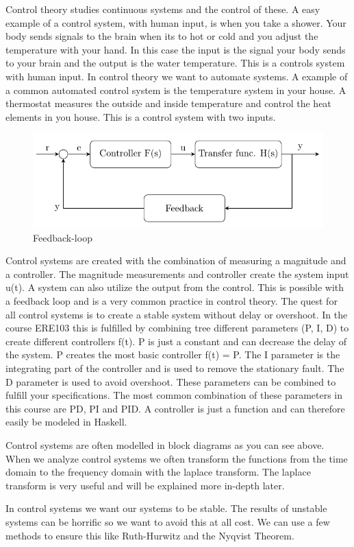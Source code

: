 Control theory studies continuous systems and the control of these. A easy example of a control system, with human input, is when you take a shower. Your body sends signals to the brain when its to hot or cold and you adjust the temperature with your hand. In this case the input is the signal your body sends to your brain and the output is the water temperature. This is a controls system with human input. In control theory we want to automate systems. A example of a common automated control system is the temperature system in your house. A thermostat measures the outside and inside temperature and control the heat elements in you house. This is a control system with two inputs.

\begin{figure}[H]
    \centering
    \includegraphics[]{Images/feedback1.PNG}
    \caption{Feedback-loop}
    \label{fig:feed}
\end{figure}


Control systems are created with the combination of measuring a magnitude and a controller. The magnitude measurements and controller create the system input u(t). A system can also utilize the output from the control. This is possible with a feedback loop and is a very common practice in control theory. The quest for all control systems is to create a stable system without delay or overshoot.  In the course ERE103 this is fulfilled by combining tree different parameters (P, I, D) to create different controllers f(t).  P is just a constant and can decrease the delay of the system. P creates the most basic controller f(t) = P. The I parameter is the integrating part of the controller and is used to remove the stationary fault. The D parameter is used to avoid overshoot. These parameters can be combined to fulfill your specifications.  The most common combination of these parameters in this course are PD, PI and PID. A controller is just a function and can therefore easily be modeled in Haskell.



Control systems are often modelled in block diagrams as you can see above. When we analyze control systems we often transform the functions from the time domain to the frequency domain with the laplace transform. The laplace transform is very useful and will be explained more in-depth later.



In control systems we want our systems to be stable. The results of unstable systems can be horrific so we want to avoid this at all cost. We can use a few methods to ensure this like Ruth-Hurwitz and the Nyqvist Theorem.



